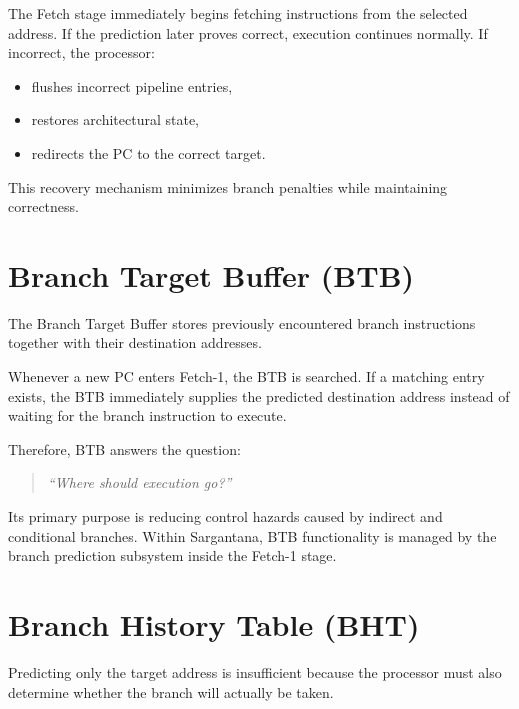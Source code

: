 The Fetch stage immediately begins fetching instructions from the selected address.
If the prediction later proves correct, execution continues normally.
If incorrect, the processor:
\begin{itemize}
  \item flushes incorrect pipeline entries,
  \item restores architectural state,
  \item redirects the PC to the correct target.
\end{itemize}

This recovery mechanism minimizes branch penalties while maintaining correctness.

\begin{rtlrefs}
\end{rtlrefs}

\section{Branch Target Buffer (BTB)}

The Branch Target Buffer stores previously encountered branch instructions together with their
destination addresses.

Whenever a new PC enters Fetch-1, the BTB is searched.
If a matching entry exists, the BTB immediately supplies the predicted destination address
instead of waiting for the branch instruction to execute.

Therefore, BTB answers the question:

\begin{quote}
\textit{``Where should execution go?''}
\end{quote}

Its primary purpose is reducing control hazards caused by indirect and conditional branches.
Within Sargantana, BTB functionality is managed by the branch prediction subsystem inside the
Fetch-1 stage.

\begin{rtlrefs}
\end{rtlrefs}

\section{Branch History Table (BHT)}

Predicting only the target address is insufficient because the processor must also determine
whether the branch will actually be taken.

